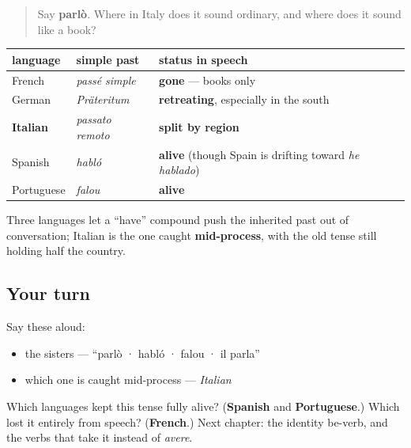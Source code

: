 \label{lesson:IT-C15-passato-europa}



\begin{quote}
Say \textbf{parlò}. Where in Italy does it sound ordinary, and where does it sound like a book?
\end{quote}

\begin{grammarlens}[title={What you've built: three retreats and two holdouts}]
\noindent
\begin{tabularx}{\linewidth}{@{}>{\raggedright\arraybackslash}X>{\raggedright\arraybackslash}X>{\raggedright\arraybackslash}X@{}}
\toprule
\textbf{language} & \textbf{simple past} & \textbf{status in speech} \\
\midrule
French & \emph{passé simple} & \textbf{gone} — books only \\
German & \emph{Präteritum} & \textbf{retreating}, especially in the south \\
\textbf{Italian} & \emph{passato remoto} & \textbf{split by region} \\
Spanish & \emph{habló} & \textbf{alive} (though Spain is drifting toward \emph{he hablado}) \\
Portuguese & \emph{falou} & \textbf{alive} \\
\bottomrule
\end{tabularx}

Three languages let a \textquotedblleft{}have\textquotedblright{} compound push the inherited past out of conversation; Italian is the one caught \textbf{mid-process}, with the old tense still holding half the country.
\end{grammarlens}

\subsection*{Your turn}
Say these aloud:

\begin{itemize}
\raggedright
  \item the sisters — \textquotedblleft{}parlò · habló · falou · il parla\textquotedblright{}
  \item which one is caught mid-process — \emph{Italian}
\end{itemize}

\begin{tcolorbox}[breakable,colback=teal!4,colframe=teal!35!black,title={Before you move on}]
Which languages kept this tense fully alive? (\textbf{Spanish} and \textbf{Portuguese}.) Which lost it entirely from speech? (\textbf{French}.) Next chapter: the identity be-verb, and the verbs that take it instead of \emph{avere}.
\end{tcolorbox}
